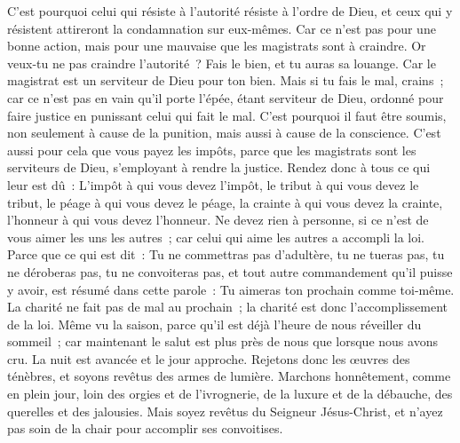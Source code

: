 \begin{multicols}{2}
C'est pourquoi celui qui résiste à l'autorité résiste à l'ordre de Dieu, et ceux qui y résistent attireront la condamnation sur eux-mêmes.
Car ce n'est pas pour une bonne action, mais pour une mauvaise que les magistrats sont à craindre. Or veux-tu ne pas craindre l'autorité~? Fais le bien, et tu auras sa louange.
Car le magistrat est un serviteur de Dieu pour ton bien. Mais si tu fais le mal, crains~; car ce n'est pas en vain qu'il porte l'épée, étant serviteur de Dieu, ordonné pour faire justice en punissant celui qui fait le mal.
C'est pourquoi il faut être soumis, non seulement à cause de la punition, mais aussi à cause de la conscience.
C'est aussi pour cela que vous payez les impôts, parce que les magistrats sont les serviteurs de Dieu, s'employant à rendre la justice.
Rendez donc à tous ce qui leur est dû~: L'impôt à qui vous devez l'impôt, le tribut à qui vous devez le tribut, le péage à qui vous devez le péage, la crainte à qui vous devez la crainte, l'honneur à qui vous devez l'honneur.
Ne devez rien à personne, si ce n'est de vous aimer les uns les autres~; car celui qui aime les autres a accompli la loi.
Parce que ce qui est dit~: Tu ne commettras pas d'adultère, tu ne tueras pas, tu ne déroberas pas, tu ne convoiteras pas, et tout autre commandement qu'il puisse y avoir, est résumé dans cette parole~: Tu aimeras ton prochain comme toi-même.
La charité ne fait pas de mal au prochain~; la charité est donc l'accomplissement de la loi.
Même vu la saison, parce qu'il est déjà l’heure de nous réveiller du sommeil~; car maintenant le salut est plus près de nous que lorsque nous avons cru.
La nuit est avancée et le jour approche. Rejetons donc les œuvres des ténèbres, et soyons revêtus des armes de lumière.
Marchons honnêtement, comme en plein jour, loin des orgies et de l'ivrognerie, de la luxure et de la débauche, des querelles et des jalousies.
Mais soyez revêtus du Seigneur Jésus-Christ, et n'ayez pas soin de la chair pour accomplir ses convoitises.

\end{multicols}
